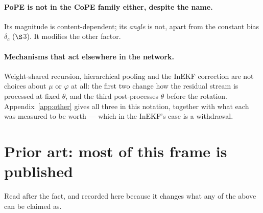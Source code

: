 \documentclass[11pt]{article}
\begin{document}
\paragraph{PoPE is not in the CoPE family either, despite the name.} Its magnitude
is content-dependent; its \emph{angle} is not, apart from the constant bias
$\delta_c$ ($\S$3). It modifies the other factor.

\paragraph{Mechanisms that act elsewhere in the network.} Weight-shared recursion,
hierarchical pooling and the InEKF correction are not choices about $\mu$ or
$\varphi$ at all: the first two change how the residual stream is processed at
fixed $\theta$, and the third post-processes $\theta$ before the rotation.
Appendix~\ref{app:other} gives all three in this notation, together with what each
was measured to be worth --- which in the InEKF's case is a withdrawal.

\section{Prior art: most of this frame is published}
\label{sec:prior}

Read after the fact, and recorded here because it changes what any of the above
can be claimed as.
\end{document}
